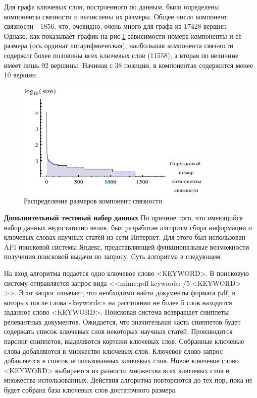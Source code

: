 Для графа ключевых слов, построенного по данным, были определены компоненты связности и вычислены их размеры. Общее число компонент связности - 1856, что, очевидно, очень много для графа из 17428 вершин. Однако, как показывает график на рис.\ref{img:abstr_hist_2} зависимости номера компоненты и её размера (ось ординат логарифмическая), наибольшая компонента связности содержит более половины всех ключевых слов (11558), а вторая по величине имеет лишь 92 вершины. Начиная с 38 позиции, в компонентах содержится менее 10 вершин.

\begin{figure}[ht]
  \begin{minipage}[ht]{1.0\linewidth}\centering
    \includegraphics[width=0.5\linewidth]{Dissertation/pics/abstr_hist_2}
    \caption{Распределение размеров компонент связности}
    \label{img:abstr_hist_2}
  \end{minipage}
\end{figure}

\textbf{Дополнительный тестовый набор данных}
По причине того, что имеющийся набор данных недостаточно велик, был разработан алгоритм сбора информации о ключевых словах научных статей из сети Интернет. Для этого был использован API поисковой системы Яндекс, представляющей функциональные возможности получения поисковой выдачи по запросу. Суть алгоритма в следующем.  

На вход алгоритма подается одно ключевое слово <KEYWORD>. В поисковую систему отправляется запрос вида <<mime:pdf keywords: /5 <KEYWORD> >>. Этот запрос означает, что необходимо найти документы формата pdf, в которых после слова «keywords:» на расстоянии не более 5 слов находится заданное слово <KEYWORD>. Поисковая система возвращает сниппеты релевантных документов. Ожидается, что значительная часть сниппетов будет содержать список ключевых слов некоторых научных статей. Производится парсинг сниппетов, выделяются кортежи ключевых слов. Собранные ключевые слова добавляются в множество ключевых слов. Ключевое слово-запрос добавляется в список использованных ключевых слов. Новое ключевое слово <KEYWORD> выбирается из разности множества всех ключевых слов и множества использованных. Действия алгоритма повторяются до тех пор, пока не будет собрана база ключевых слов достаточного размера.

